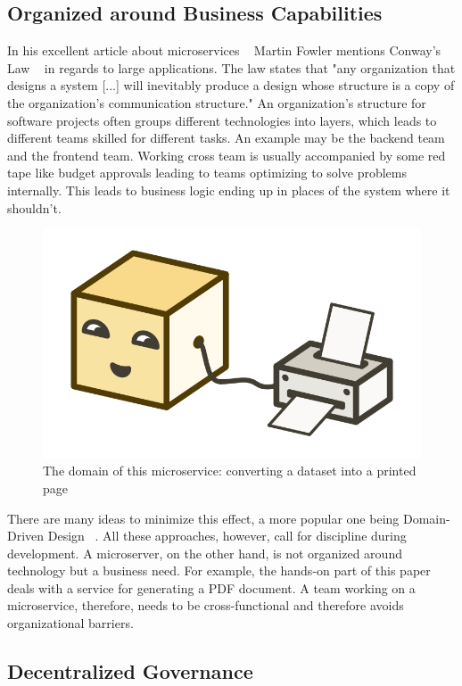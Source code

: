 \subsection{Organized around Business Capabilities}

In his excellent article about microservices ~\cite{microservices.2014} Martin Fowler mentions Conway's Law ~\cite{conway.1968} in regards to large applications. The law states that "any organization that designs a system [...] will inevitably produce a design whose structure is a copy of the organization's communication structure." An organization's structure for software projects often groups different technologies into layers, which leads to different teams skilled for different tasks. An example may be the backend team and the frontend team. Working cross team is usually accompanied by some red tape like budget approvals leading to teams optimizing to solve problems internally. This leads to business logic ending up in places of the system where it shouldn't.

\begin{figure}[ht]
  \centering
  \includegraphics[width=0.4\linewidth]{assets/illustration-microservice-printer.png}
  \caption{The domain of this microservice: converting a dataset into a printed page}
\end{figure}

There are many ideas to minimize this effect, a more popular one being Domain-Driven Design ~\cite{evans.2003}. All these approaches, however, call for discipline during development. A microserver, on the other hand, is not organized around technology but a business need. For example, the hands-on part of this paper deals with a service for generating a PDF document. A team working on a microservice, therefore, needs to be cross-functional and therefore avoids organizational barriers.


\subsection{Decentralized Governance}

